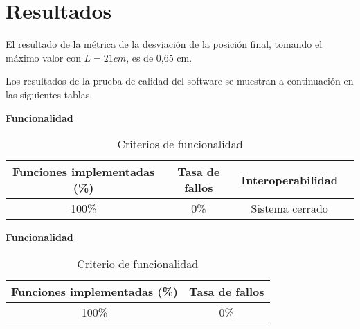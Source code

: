 \section{Resultados}

El resultado de la métrica de la desviación de la posición final, tomando el máximo valor con $L = 21 cm$, es de 0,65 cm.

Los resultados de la prueba de calidad del software se muestran a continuación en las siguientes tablas.

\textbf{Funcionalidad}

\begin{table}[ht]
	\centering
	\begin{tabular}{|c|c|c|c|}
		\hline
		\textbf{Funciones implementadas (\%)} & \textbf{Tasa de fallos} & \textbf{Interoperabilidad} \\
		\hline
		100\% & 0\% & Sistema cerrado \\
		\hline
	\end{tabular}
	\caption{Criterios de funcionalidad}
	\label{tab:Resultados}
\end{table}

\textbf{Funcionalidad}

\begin{table}[ht]
	\centering
	\begin{tabular}{|c|c|}
		\hline
		\textbf{Funciones implementadas (\%)} & \textbf{Tasa de fallos} \\
		\hline
		100\% & 0\% \\
		\hline
	\end{tabular}
	\caption{Criterio de funcionalidad}
	\label{tab:Resultados}
\end{table}